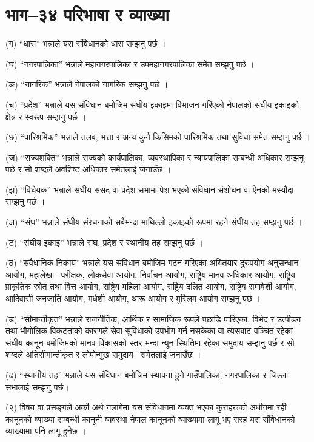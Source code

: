 \section{भाग–३४ परिभाषा र व्याख्या}

(ग) “धारा” भन्नाले यस संविधानको धारा सम्झनु पर्छ ।

(घ) “नगरपालिका” भन्नाले महानगरपालिका र उपमहानगरपालिका समेत सम्झनु पर्छ ।

(ङ) “नागरिक” भन्नाले नेपालको नागरिक सम्झनु पर्छ ।

(च) “प्रदेश” भन्नाले यस संविधान बमोजिम संघीय इकाइमा विभाजन गरिएको नेपालको संघीय इकाइको क्षेत्र र स्वरूप सम्झनु पर्छ ।

(छ) “पारिश्रमिक” भन्नाले तलब, भत्ता र अन्य कुनै किसिमको पारिश्रमिक तथा सुविधा समेत सम्झनु पर्छ ।

(ज) “राज्यशक्ति” भन्नाले राज्यको कार्यपालिका, व्यवस्थापिका र न्यायपालिका सम्बन्धी अधिकार सम्झनु पर्छ र सो शब्दले अवशिष्ट अधिकार समेतलाई जनाउँछ ।

(झ) “विधेयक” भन्नाले संघीय संसद वा प्रदेश सभामा पेश भएको संविधान संशोधन वा ऐनको मस्यौदा सम्झनु पर्छ ।

(ञ) “संघ” भन्नाले संघीय संरचनाको सबैभन्दा माथिल्लो इकाइको रूपमा रहने संघीय तह सम्झनु पर्छ ।

(ट) “संघीय इकाइ” भन्नाले संघ, प्रदेश र स्थानीय तह सम्झनु पर्छ ।

(ठ) “संवैधानिक निकाय” भन्नाले यस संविधान बमोजिम गठन गरिएका अख्तियार दुरुपयोग अनुसन्धान आयोग, महालेखा  परीक्षक, लोकसेवा आयोग, निर्वाचन आयोग, राष्ट्रिय मानव अधिकार आयोग, राष्ट्रिय प्राकृतिक स्रोत तथा वित्त आयोग, राष्ट्रिय महिला आयोग, राष्ट्रिय दलित आयोग, राष्ट्रिय समावेशी आयोग, आदिवासी जनजाति आयोग, मधेशी आयोग, थारू आयोग र मुस्लिम आयोग सम्झनु पर्छ ।

(ड) “सीमान्तीकृत” भन्नाले राजनीतिक, आर्थिक र सामाजिक रूपले पछाडि पारिएका, विभेद र उत्पीडन तथा भौगोलिक विकटताको कारणले सेवा सुविधाको उपभोग गर्न नसकेका वा त्यसबाट वञ्चित रहेका संघीय कानून बमोजिमको मानव विकासको स्तर भन्दा न्यून स्थितिमा रहेका समुदाय सम्झनु पर्छ र सो शब्दले अतिसीमान्तीकृत र लोपोन्मुख समुदाय  समेतलाई जनाउँछ ।

(ढ) “स्थानीय तह” भन्नाले यस संविधान बमोजिम स्थापना हुने गाउँँपालिका, नगरपालिका र जिल्ला सभालाई सम्झनु पर्छ।

(२) विषय वा प्रसङ्गले अर्को अर्थ नलागेमा यस संविधानमा व्यक्त भएका कुराहरूको अधीनमा रही कानूनको व्याख्या सम्बन्धी कानूनी व्यवस्था नेपाल कानूनको व्याख्यामा लागू भए सरह यस संविधानको व्याख्यामा पनि लागू हुनेछ ।

 